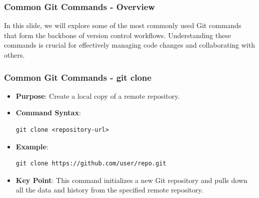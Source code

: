\documentclass{beamer}
\begin{document}
\begin{frame}[fragile]
    \frametitle{Common Git Commands - Overview}
    In this slide, we will explore some of the most commonly used Git commands that form the backbone of version control workflows. 
    Understanding these commands is crucial for effectively managing code changes and collaborating with others.
\end{frame}

\begin{frame}[fragile]
    \frametitle{Common Git Commands - git clone}
    \begin{itemize}
        \item \textbf{Purpose}: Create a local copy of a remote repository.
        \item \textbf{Command Syntax}: 
        \begin{lstlisting}
git clone <repository-url>
        \end{lstlisting}
        \item \textbf{Example}: 
        \begin{lstlisting}
git clone https://github.com/user/repo.git
        \end{lstlisting}
        \item \textbf{Key Point}: 
        This command initializes a new Git repository and pulls down all the data and history from the specified remote repository.
    \end{itemize}
\end{frame}
\end{document}
